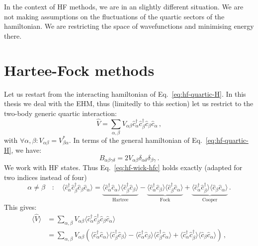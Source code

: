 In the context of HF methods, we are in an slightly different situation. We are not making assumptions on the fluctuations of the quartic sectors of the hamiltonian. We are restricting the space of wavefunctions and minimising energy there. 

\section{Hartee-Fock methods}

Let us restart from the interacting hamiltonian of Eq.~\eqref{eq:hf-quartic-H}. In this thesis we deal with the EHM, thus (limitedly to this section) let us restrict to the two-body generic quartic interaction:
\[
\hat V = \sum_{\alpha,\beta} V_{\alpha\beta} \hat c_\alpha^\dagger \hat c_\beta^\dagger \hat c_\beta \hat c_\alpha \, ,
\]
with $\forall \alpha, \beta \colon V_{\alpha\beta}=V_{\beta\alpha}^*$. In terms of the general hamiltonian of Eq.~\eqref{eq:hf-quartic-H}, we have:
\begin{equation}\label{appeq:mft-B=2V}
	B_{\alpha\beta\gamma\delta} = 2V_{\alpha\beta} \delta_{\alpha\delta} \delta_{\beta\gamma} \, .
\end{equation}
We work with HF states. Thus Eq.~\eqref{eq:hf-wick-hfc} holds exactly (adapted for two indices instead of four)
\[
\alpha \neq \beta
\quad\colon\quad
\langle
\hat c_\alpha^\dagger \hat c_\beta^\dagger \hat c_\beta \hat c_\alpha
\rangle = \underbrace{
	\langle 
	\hat c_\alpha^\dagger \hat c_\alpha
	\rangle \langle	
	\hat c_\beta^\dagger \hat c_\beta
	\rangle
}_{\text{Hartree}}
- 
\underbrace{
	\langle 
	\hat c_\alpha^\dagger \hat c_\beta
	\rangle \langle	
	\hat c_\beta^\dagger \hat c_\alpha 
	\rangle 
}_{\text{Fock}}
+ 
\underbrace{
	\langle 
	\hat c_\alpha^\dagger \hat c_\beta^\dagger
	\rangle \langle	
	\hat c_\beta \hat c_\alpha 
	\rangle 
}_{\text{Cooper}} \, .
\]
This gives:
\begin{align}
	\big\langle \hat V \big\rangle &= \sum_{\alpha,\beta} V_{\alpha\beta} \big\langle \hat c_\alpha^\dagger \hat c_\beta^\dagger \hat c_\beta \hat c_\alpha \big\rangle \nonumber \\
	&= \sum_{\alpha,\beta} V_{\alpha\beta} \left(
	\langle 
	\hat c_\alpha^\dagger \hat c_\alpha
	\rangle \langle	
	\hat c_\beta^\dagger \hat c_\beta
	\rangle - \langle 
	\hat c_\alpha^\dagger \hat c_\beta
	\rangle \langle	
	\hat c_\beta^\dagger \hat c_\alpha 
	\rangle + \langle 
	\hat c_\alpha^\dagger \hat c_\beta^\dagger
	\rangle \langle	
	\hat c_\beta \hat c_\alpha 
	\rangle 
	\right) \, , \label{appeq:mft-wick-EV} 
\end{align}
